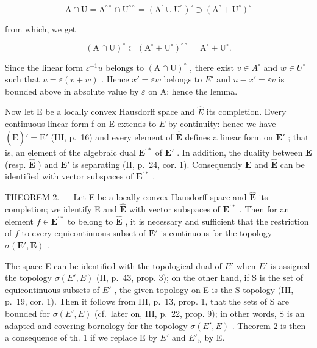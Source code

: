 \[
\mathrm{A} \cap \mathrm{U} = \mathrm{A} ^ {\circ \circ} \cap \mathrm{U} ^ {\circ \circ} = (\mathrm{A} ^ {\circ} \cup \mathrm{U} ^ {\circ}) ^ {\circ} \supset (\mathrm{A} ^ {\circ} + \mathrm{U} ^ {\circ}) ^ {\circ}
\]

from which, we get

\[
(\mathrm{A} \cap \mathrm{U}) ^ {\circ} \subset (\mathrm{A} ^ {\circ} + \mathrm{U} ^ {\circ}) ^ {\circ \circ} = \mathrm{A} ^ {\circ} + \mathrm{U} ^ {\circ}.
\]

Since the linear form \(\varepsilon^{-1}u\) belongs to \((\mathrm{A}\cap\mathrm{U})^{\circ}\) , there exist \(v\in A^{\circ}\) and \(w\in U^{\circ}\) such that \(u=\varepsilon(v+w)\) . Hence \(x'=\varepsilon w\) belongs to \(E'\) and \(u-x'=\varepsilon v\) is bounded above in absolute value by \(\varepsilon\) on A; hence the lemma.

Now let E be a locally convex Hausdorff space and \(\hat{E}\) its completion. Every continuous linear form f on E extends to \(\hat{E}\) by continuity: hence we have \((\hat{\mathrm{E}})' = \mathrm{E}'\) (III, p.~16) and every element of \(\hat{\mathbf{E}}\) defines a linear form on \(\mathbf{E}'\) ; that is, an element of the algebraic dual \(\mathbf{E}^{\prime *}\) of \(\mathbf{E}'\) . In addition, the duality between \(\mathbf{E}\) (resp. \(\hat{\mathbf{E}}\) ) and \(\mathbf{E}'\) is separating (II, p.~24, cor. 1). Consequently \(\mathbf{E}\) and \(\hat{\mathbf{E}}\) can be identified with vector subspaces of \(\mathbf{E}^{\prime *}\) .

THEOREM 2. --- Let E be a locally convex Hausdorff space and \(\hat{\mathbf{E}}\) its completion; we identify E and \(\hat{\mathbf{E}}\) with vector subspaces of \(\mathbf{E}^{\prime *}\) . Then for an element \(f \in \mathbf{E}^{\prime *}\) to belong to \(\hat{\mathbf{E}}\) , it is necessary and sufficient that the restriction of \(f\) to every equicontinuous subset of \(\mathbf{E}'\) is continuous for the topology \(\sigma(\mathbf{E}', \mathbf{E})\) .

The space E can be identified with the topological dual of \(E'\) when \(E'\) is assigned the topology \(\sigma(E', E)\) (II, p.~43, prop. 3); on the other hand, if S is the set of equicontinuous subsets of \(E'\) , the given topology on E is the S-topology (III, p.~19, cor. 1). Then it follows from III, p.~13, prop. 1, that the sets of S are bounded for \(\sigma(E', E)\) (cf.~later on, III, p.~22, prop. 9); in other words, S is an adapted and covering bornology for the topology \(\sigma(E', E)\) . Theorem 2 is then a consequence of th. 1 if we replace E by \(E'\) and \(E'_{S}\) by E.

